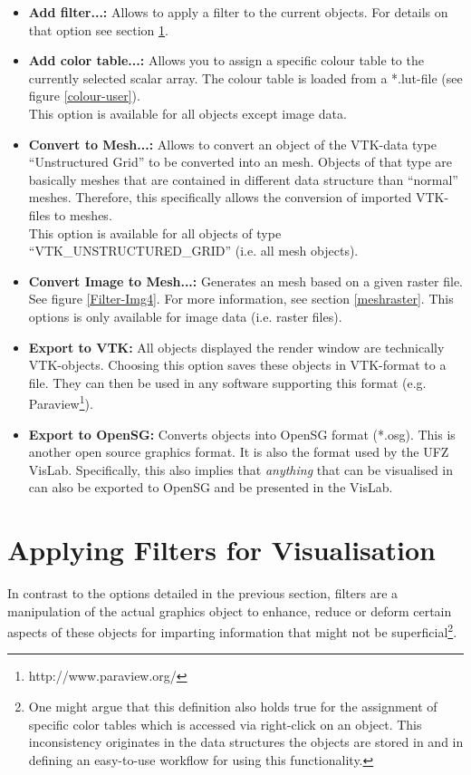 \begin{itemize}
\item \textbf{Add filter...:} Allows to apply a filter to the current objects. For details on that option see section \ref{filters}.
\item \textbf{Add color table...:} Allows you to assign a specific colour table to the currently selected scalar array. The colour table is loaded from a *.lut-file (see figure \ref{colour-user}).\\
    This option is available for all objects except image data.
\item \textbf{Convert to Mesh...:} Allows to convert an object of the VTK-data type ``Unstructured Grid'' to be converted into an \ogs mesh. Objects of that type are basically meshes that are contained in different data structure than ``normal'' \ogs meshes. Therefore, this specifically allows the conversion of imported VTK-files to \ogs meshes.\\
    This option is available for all objects of type ``VTK\_UN\-STRUCT\-URED\_GRID'' (i.e. all mesh objects).
\item \textbf{Convert Image to Mesh...:} Generates an \ogs mesh based on a given raster file. See figure \ref{Filter-Img4}. For more information, see section \ref{meshraster}. This options is only available for image data (i.e. raster files).
\item \textbf{Export to VTK:} All objects displayed the render window are technically VTK-objects. Choosing this option saves these objects in VTK-format to a file. They can then be used in any software supporting this format (e.g. Paraview\footnote{http://www.paraview.org/}).
\item \textbf{Export to OpenSG:} Converts objects into OpenSG format (*.osg). This is another open source graphics format. It is also the format used by the UFZ VisLab. Specifically, this also implies that \emph{anything} that can be visualised in \ogs can also be exported to OpenSG and be presented in the VisLab.
\end{itemize}

\section{Applying Filters for Visualisation}
\label{filters}

In contrast to the options detailed in the previous section, filters are a manipulation of the actual graphics object to enhance, reduce or deform certain aspects of these objects for imparting information that might not be superficial\footnote{One might argue that this definition also holds true for the assignment of specific color tables which is accessed via right-click on an object. This inconsistency originates in the data structures the objects are stored in and in defining an easy-to-use workflow for using this functionality.}.

